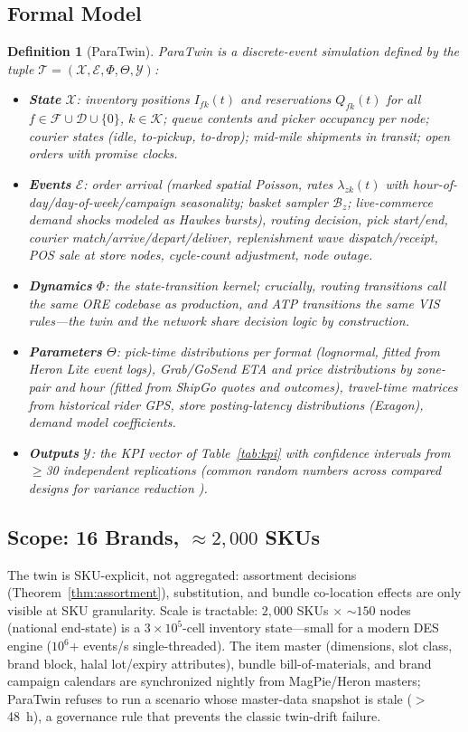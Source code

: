 \documentclass[journal]{IEEEtran}
\newtheorem{definition}{Definition}
\begin{document}
\subsection{Formal Model}
\begin{definition}[ParaTwin]
\label{def:twin}
ParaTwin is a discrete-event simulation \cite{law} defined by the tuple
$\mathcal{T} = (\mathcal{X}, \mathcal{E}, \Phi, \Theta, \mathcal{Y})$:
\begin{itemize}[leftmargin=*]
  \item \textbf{State} $\mathcal{X}$: inventory positions $I_{fk}(t)$ and reservations $Q_{fk}(t)$ for all $f \in \mathcal{F} \cup \mathcal{D} \cup \{0\}$, $k \in \mathcal{K}$; queue contents and picker occupancy per node; courier states (idle, to-pickup, to-drop); mid-mile shipments in transit; open orders with promise clocks.
  \item \textbf{Events} $\mathcal{E}$: order arrival (marked spatial Poisson, rates $\lambda_{zk}(t)$ with hour-of-day/day-of-week/campaign seasonality; basket sampler $\mathcal{B}_z$; live-commerce demand shocks modeled as Hawkes bursts), routing decision, pick start/end, courier match/arrive/depart/deliver, replenishment wave dispatch/receipt, POS sale at store nodes, cycle-count adjustment, node outage.
  \item \textbf{Dynamics} $\Phi$: the state-transition kernel; crucially, routing transitions call the \emph{same ORE codebase} as production, and ATP transitions the same VIS rules---the twin and the network share decision logic by construction.
  \item \textbf{Parameters} $\Theta$: pick-time distributions per format (lognormal, fitted from Heron Lite event logs), Grab/GoSend ETA and price distributions by zone-pair and hour (fitted from ShipGo quotes and outcomes), travel-time matrices from historical rider GPS, store posting-latency distributions (Exagon), demand model coefficients.
  \item \textbf{Outputs} $\mathcal{Y}$: the KPI vector of Table~\ref{tab:kpi} with confidence intervals from $\ge$30 independent replications (common random numbers across compared designs for variance reduction \cite{law}).
\end{itemize}
\end{definition}

\subsection{Scope: 16 Brands, ${\approx}2{,}000$ SKUs}
The twin is SKU-explicit, not aggregated: assortment decisions (Theorem~\ref{thm:assortment}), substitution, and bundle co-location effects are only visible at SKU granularity. Scale is tractable: $2{,}000$ SKUs $\times$ ${\sim}150$ nodes (national end-state) is a $3\times10^5$-cell inventory state---small for a modern DES engine ($10^6$+ events/s single-threaded). The item master (dimensions, slot class, brand block, halal lot/expiry attributes), bundle bill-of-materials, and brand campaign calendars are synchronized nightly from MagPie/Heron masters; ParaTwin refuses to run a scenario whose master-data snapshot is stale ($>$48~h), a governance rule that prevents the classic twin-drift failure.
\end{document}
